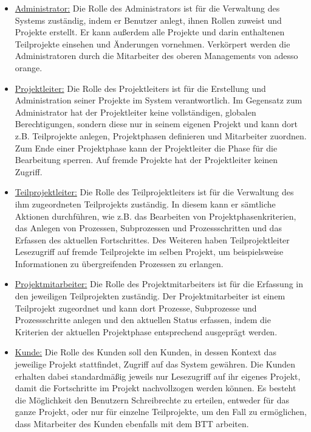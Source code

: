 \begin{itemize}
    \item[] \underline{Administrator:} Die Rolle des Administrators ist für die Verwaltung des Systems zuständig, indem er Benutzer anlegt, ihnen Rollen zuweist und Projekte erstellt. Er kann außerdem alle Projekte und darin enthaltenen Teilprojekte einsehen und Änderungen vornehmen. Verkörpert werden die Administratoren durch die Mitarbeiter des oberen Managements von adesso orange.
    
    \item[] \underline{Projektleiter:} Die Rolle des Projektleiters ist für die Erstellung und Administration seiner Projekte im System verantwortlich. Im Gegensatz zum Administrator hat der Projektleiter keine vollständigen, globalen Berechtigungen, sondern diese nur in seinem eigenen Projekt und kann dort z.B. Teilprojekte anlegen, Projektphasen definieren und Mitarbeiter zuordnen. Zum Ende einer Projektphase kann der Projektleiter die Phase für die Bearbeitung sperren. Auf fremde Projekte hat der Projektleiter keinen Zugriff. 
    
    \item[] \underline{Teilprojektleiter:} Die Rolle des Teilprojektleiters ist für die Verwaltung des ihm zugeordneten Teilprojekts zuständig. In diesem kann er sämtliche Aktionen durchführen, wie z.B. das Bearbeiten von Projektphasenkriterien, das Anlegen von Prozessen, Subprozessen und Prozessschritten und das Erfassen des aktuellen Fortschrittes. Des Weiteren haben Teilprojektleiter Lesezugriff auf fremde Teilprojekte im selben Projekt, um beispielsweise Informationen zu übergreifenden Prozessen zu erlangen.

    \item[] \underline{Projektmitarbeiter:} Die Rolle des Projektmitarbeiters ist für die Erfassung in den jeweiligen Teilprojekten zuständig. Der Projektmitarbeiter ist einem Teilprojekt zugeordnet und kann dort Prozesse, Subprozesse und Prozessschritte anlegen und den aktuellen Status erfassen, indem die Kriterien der aktuellen Projektphase entsprechend ausgeprägt werden.

    \item[] \underline{Kunde:} Die Rolle des Kunden soll den Kunden, in dessen Kontext das jeweilige Projekt stattfindet, Zugriff auf das System gewähren. Die Kunden erhalten dabei standardmäßig jeweils nur Lesezugriff auf ihr eigenes Projekt, damit die Fortschritte im Projekt nachvollzogen werden können. Es besteht die Möglichkeit den Benutzern Schreibrechte zu erteilen, entweder für das ganze Projekt, oder nur für einzelne Teilprojekte, um den Fall zu ermöglichen, dass Mitarbeiter des Kunden ebenfalls mit dem BTT arbeiten.  
\end{itemize}

